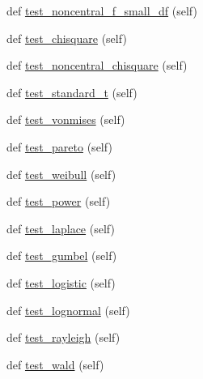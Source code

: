 \begin{DoxyCompactItemize}
\item 
def \hyperlink{classnumpy_1_1random_1_1tests_1_1test__randomstate_1_1TestBroadcast_a24a0303f978fbe7786fe3dc46d1752d6}{test\+\_\+noncentral\+\_\+f\+\_\+small\+\_\+df} (self)
\item 
def \hyperlink{classnumpy_1_1random_1_1tests_1_1test__randomstate_1_1TestBroadcast_a7b2371aa574351dd0641d0bf52a9a001}{test\+\_\+chisquare} (self)
\item 
def \hyperlink{classnumpy_1_1random_1_1tests_1_1test__randomstate_1_1TestBroadcast_a6cf0f4623fe3011ecb1d4037d7fd5d39}{test\+\_\+noncentral\+\_\+chisquare} (self)
\item 
def \hyperlink{classnumpy_1_1random_1_1tests_1_1test__randomstate_1_1TestBroadcast_aeb2f0687e830a839eed5455a82eabd5e}{test\+\_\+standard\+\_\+t} (self)
\item 
def \hyperlink{classnumpy_1_1random_1_1tests_1_1test__randomstate_1_1TestBroadcast_ab20c120cbb153abe11da9541069e60fb}{test\+\_\+vonmises} (self)
\item 
def \hyperlink{classnumpy_1_1random_1_1tests_1_1test__randomstate_1_1TestBroadcast_abed54c45e70d6b59b2e3baeb4c042c47}{test\+\_\+pareto} (self)
\item 
def \hyperlink{classnumpy_1_1random_1_1tests_1_1test__randomstate_1_1TestBroadcast_a78766748cf284ec06dd0402d39e5caa8}{test\+\_\+weibull} (self)
\item 
def \hyperlink{classnumpy_1_1random_1_1tests_1_1test__randomstate_1_1TestBroadcast_a04999451d51c18dae9047da574fa90c6}{test\+\_\+power} (self)
\item 
def \hyperlink{classnumpy_1_1random_1_1tests_1_1test__randomstate_1_1TestBroadcast_a16eda9a6fed89417b401f9b5b36cfd25}{test\+\_\+laplace} (self)
\item 
def \hyperlink{classnumpy_1_1random_1_1tests_1_1test__randomstate_1_1TestBroadcast_abe06ed9243a114cfcaf64eae76343414}{test\+\_\+gumbel} (self)
\item 
def \hyperlink{classnumpy_1_1random_1_1tests_1_1test__randomstate_1_1TestBroadcast_a4764cdf912d846b1cfa747ec28e8692d}{test\+\_\+logistic} (self)
\item 
def \hyperlink{classnumpy_1_1random_1_1tests_1_1test__randomstate_1_1TestBroadcast_a2443bfa904ad0fd4498cb0094034ce61}{test\+\_\+lognormal} (self)
\item 
def \hyperlink{classnumpy_1_1random_1_1tests_1_1test__randomstate_1_1TestBroadcast_a3904a4902d93fb7145fbb02828b42724}{test\+\_\+rayleigh} (self)
\item 
def \hyperlink{classnumpy_1_1random_1_1tests_1_1test__randomstate_1_1TestBroadcast_a5a6bcdcd414c7d0c325e177d3c0a086d}{test\+\_\+wald} (self)

\end{DoxyCompactItemize}
